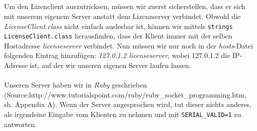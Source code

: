 \documentclass{scrartcl}
\begin{document}
    \subsection{}
    \label{sub:3.2}
      Um den Lizenclient auszutricksen, müssen wir zuerst sicherstellen, dass
      er sich mit unserem eigenem Server anstatt dem Lizenzserver verbindet.
      Obwohl die \textit{LicenseClient.class} nicht einfach auslesbar ist,
      können wir mittels \texttt{strings LicenseClient.class} herausfinden,
      dass der Klient immer mit der selben Hostadresse \textit{licenseserver}
      verbindet.
      Nun müssen wir nur noch in der \textit{hosts}-Datei folgenden Eintrag
      hinzufügen: \textit{127.0.1.2 licenseserver}, wobei 127.0.1.2 die
      IP-Adresse ist, auf der wir unseren eigenen Server laufen lassen.\\\\
      Unseren Server haben wir in \textit{Ruby} geschrieben\\
      (Source:http://www.tutorialspoint.com/ruby/ruby\_socket\_programming.htm,
      sh. Appendix A). Wenn der Server angesprochen wird, tut dieser nichts
      anderes, als irgendeine Eingabe vom Klienten zu nehmen und mit
      \texttt{SERIAL\_VALID=1} zu antworten. 
\end{document}
